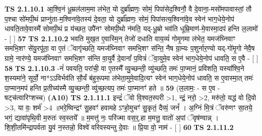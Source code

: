 \documentclass[17pt]{extarticle}
\begin{document}
                                        \textbf{ TS 2.1.10.1} \newline
                  आ॒श्वि॒नं धू॒म्रल॑लाम॒मा ल॑भेत॒ यो दुर्ब्रा᳚ह्मणः॒ सोमं॒ पिपा॑सेद॒श्विनौ॒ वै दे॒वाना॒-मसो॑मपावास्तां॒ तौ प॒श्चा सो॑मपी॒थं प्राप्नु॑ता-म॒श्विना॑वे॒तस्य॑ दे॒वता॒ यो दुर्ब्रा᳚ह्मणः॒ सोमं॒ पिपा॑सत्य॒श्विना॑वे॒व स्वेन॑ भाग॒धेये॒नोप॑ धावति॒तावे॒वास्मै॑ सोमपी॒थं प्र य॑च्छत॒ उपै॑नꣳ सोमपी॒थो न॑मति॒ यद्-धू॒म्रो भव॑ति धूम्रि॒माण॑-मे॒वास्मा॒दप॑ हन्ति ल॒लामो॑ - [  ] \textbf{  57} \newline
                  \newline
                                \textbf{ TS 2.1.10.2} \newline
                  भवति मुख॒त ए॒वास्मि॒न् तेजो॑ दधाति वाय॒व्यं॑ गोमृ॒गमा ल॑भेत॒ यमज॑घ्निवाꣳ समभि॒शꣳ से॑यु॒रपू॑ता॒ वा ए॒तं ॅवागृ॑च्छति॒ यमज॑घ्निवाꣳ समभि॒शꣳ स॑न्ति॒ नैष ग्रा॒म्यः प॒शुर्नार॒ण्यो यद्-गो॑मृ॒गो नेवै॒ष ग्रामे॒ नार॑ण्ये॒ यमज॑घ्निवाꣳ समभि॒शꣳ स॑न्ति वा॒युर्वै दे॒वानां᳚ प॒वित्रं॑ ॅवा॒युमे॒व स्वेन॑ भाग॒धेये॒नोप॑ धावति॒ स ए॒वै - [  ] \textbf{  58} \newline
                  \newline
                                \textbf{ TS 2.1.10.3} \newline
                  -नं॑ पवयति॒ परा॑ची॒ वा ए॒तस्मै᳚ व्यु॒च्छन्ती॒ व्यु॑च्छति॒ तमः॑ पा॒प्मानं॒ प्रवि॑शति॒ यस्या᳚श्वि॒ने श॒स्यमा॑ने॒ सूर्यो॒ ना*ऽऽविर्भव॑ति सौ॒र्यं ब॑हुरू॒पमा ल॑भेता॒मुमे॒वादि॒त्यꣳ स्वेन॑ भाग॒धेये॒नोप॑ धावति॒ स ए॒वास्मा॒त् तमः॑ पा॒प्मान॒मप॑ हन्ति प्र॒तीच्य॑स्मै व्यु॒च्छन्ती॒ व्यु॑च्छ॒त्यप॒ तमः॑ पा॒प्मानꣳ॑ हते ॥ \textbf{  59} \newline
                  \newline
                      (ल॒लामः॒ - स ए॒व - षट्च॑त्वारिꣳशच्च)  \textbf{(A10)} \newline \newline
                                        \textbf{ TS 2.1.11.1} \newline
                  इन्द्रं॑ ॅवो वि॒श्वत॒स्परी >1, न्द्रं॒ नरो॒ >2, मरु॑तो॒ यद्ध॑ वो दि॒वो >3, या वः॒ शर्म॑ >4 ॥भरे॒ष्विन्द्रꣳ॑ सु॒हवꣳ॑ हवामहे ऽꣳहो॒मुचꣳ॑ सु॒कृतं॒ दैव्यं॒ जनं᳚ । अ॒ग्निं मि॒त्रं ॅवरु॑णꣳ सा॒तये॒ भगं॒ द्यावा॑पृथि॒वी म॒रुतः॑ स्व॒स्तये᳚ ॥ म॒मत्तु॑ नः॒ परि॑ज्मा वस॒र्॒.हा म॒मत्तु॒ वातो॑ अ॒पां ॅवृष॑ण्वान्न् । शि॒शी॒तमि॑न्द्रापर्वता यु॒वं न॒स्तन्नो॒ विश्वे॑ वरिवस्यन्तु दे॒वाः ॥ प्रि॒या वो॒ नाम॑ - [  ] \textbf{  60} \newline
                  \newline
                                \textbf{ TS 2.1.11.2} \newline
\end{document}
